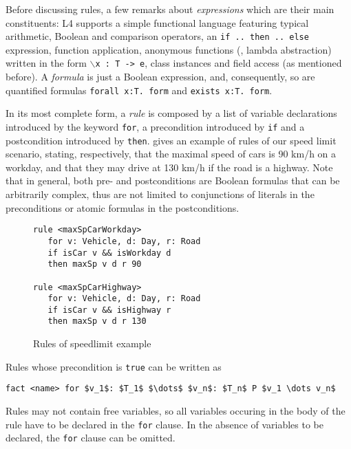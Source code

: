 Before discussing rules, a few remarks about \emph{expressions} which are
their main constituents: L4 supports a simple functional language featuring
typical arithmetic, Boolean and comparison operators, an \texttt{if .. then
  .. else} expression, function application, anonymous functions (\ie, lambda
abstraction) written in the form \texttt{$\backslash$x : T -> e}, class
instances and field access (as mentioned before). A \emph{formula} is just a
Boolean expression, and, consequently, so are quantified formulas
\texttt{forall x:T. form} and \texttt{exists x:T. form}.

In its most complete form, a \emph{rule} is composed by a list of variable
declarations introduced by the keyword \texttt{for}, a precondition introduced
by \texttt{if} and a postcondition introduced by
\texttt{then}.  gives an example of rules of our speed limit
scenario, stating, respectively, that the maximal speed of cars is 90 km/h on a
workday,
and that they may drive at 130 km/h if the road is a highway.  Note that in
general, both pre- and postconditions are Boolean formulas that can be
arbitrarily complex, thus are not limited to conjunctions of literals in the
preconditions or atomic formulas in the postconditions.

\begin{figure}[h!]

  \begin{lstlisting}
rule <maxSpCarWorkday> 
   for v: Vehicle, d: Day, r: Road
   if isCar v && isWorkday d
   then maxSp v d r 90

rule <maxSpCarHighway>
   for v: Vehicle, d: Day, r: Road
   if isCar v && isHighway r
   then maxSp v d r 130
\end{lstlisting}

  \caption{Rules of speedlimit example}\label{fig:rules}
\end{figure}

Rules whose precondition is \texttt{true} can be written as

\begin{lstlisting}[frame=none,mathescape=true]
fact <name> for $v_1$: $T_1$ $\dots$ $v_n$: $T_n$ P $v_1 \dots v_n$
\end{lstlisting}

Rules may not contain free variables, so all variables occuring in the body of
the rule have to be declared in the \texttt{for} clause. In the absence of
variables to be declared, the \texttt{for} clause can be omitted.

